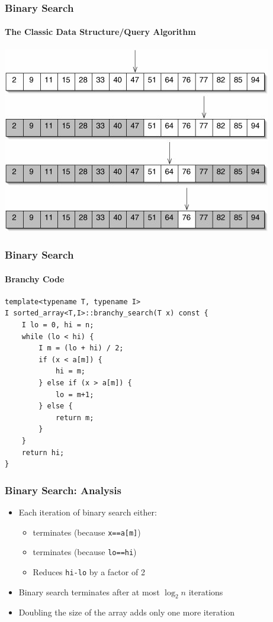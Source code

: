 \documentclass[xcolor=dvipsnames]{beamer}
\begin{document}
\begin{frame}
  \frametitle{Binary Search}
  \framesubtitle{The Classic Data Structure/Query Algorithm}

  \begin{center}
    \includegraphics[width=.9\textwidth]{images/binary-search}
  \end{center}

\end{frame}


\begin{frame}[fragile]
  \frametitle{Binary Search}
  \framesubtitle{Branchy Code}

\begin{verbatim}
template<typename T, typename I>
I sorted_array<T,I>::branchy_search(T x) const {
    I lo = 0, hi = n;
    while (lo < hi) {
        I m = (lo + hi) / 2;
        if (x < a[m]) {
            hi = m;
        } else if (x > a[m]) {
            lo = m+1;
        } else {
            return m;
        }
    }
    return hi;
}
\end{verbatim}
\end{frame}

\begin{frame}[fragile]
  \frametitle{Binary Search: Analysis}

  \begin{itemize}
    \item<+->Each iteration of binary search either:
    \begin{itemize}
      \item<+->terminates (because \texttt{x==a[m]})
      \item<+->terminates (because \texttt{lo==hi})
      \item<+->Reduces \texttt{hi-lo} by a factor of 2
    \end{itemize}
    \item<+->Binary search terminates after at most $\log_2 n$ iterations
    \item<+->Doubling the size of the array adds only one more iteration
  \end{itemize}
\end{frame}
\end{document}

